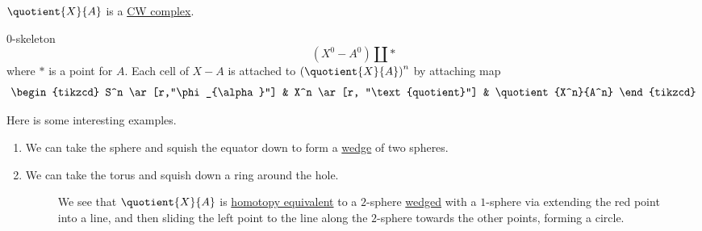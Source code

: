 \begin{remark}
	\(\quotient{X}{A} \) is a \hyperref[def:CW-Complex]{CW complex}.
\end{remark}
\(0\)-skeleton
\[
	(X^0 - A^0)\coprod \ast
\]
where \(\ast\) is a point for \(A\). Each cell of \(X-A\) is attached to \(\left(\quotient{X}{A} \right)^n\)
by attaching map
\[
	\begin{tikzcd}
		S^n \ar[r,"\phi_{\alpha}"] & X^n \ar[r, "\text{quotient}"] & \quotient{X^n}{A^n}
	\end{tikzcd}
\]

\begin{eg}
	Here is some interesting examples.
	\begin{enumerate}
		\item We can take the sphere and squish the equator down to form a \hyperref[sssec:Wedge-sum]{wedge} of two spheres.
		      \begin{figure}[H]
			      \centering
			      \label{fig:eg:quotient-cw-complex-sphere}
		      \end{figure}
		\item We can take the torus and squish down a ring around the hole.
		      \begin{figure}[H]
			      \centering
			      \caption{We see that \(\quotient{X}{A}\) is \hyperref[def:homotopy-equivalence]{homotopy equivalent}
				      to a \(2\)-sphere \hyperref[sssec:Wedge-sum]{wedged} with a \(1\)-sphere via extending the red point into a line, and then
				      sliding the left point to the line along the \(2\)-sphere towards the other points, forming a circle.}
			      \label{fig:eg:quotient-cw-complex-torus}
		      \end{figure}
	\end{enumerate}
\end{eg}
